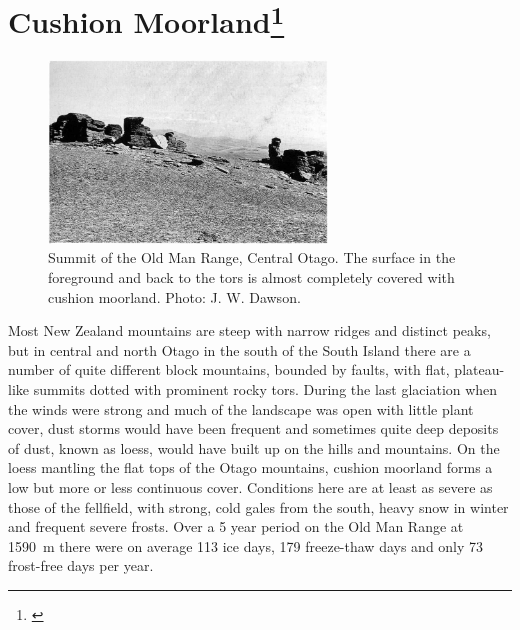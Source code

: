 \section[Cushion Moorland]{Cushion Moorland\thinspace\footnote{\cite{mark1970high}}}

\begin{figure}
	\includegraphics[width=0.66\textwidth]{graphics/figure113summit.jpg}
	\centering
	\caption[Summit of the Old Man Range]{Summit of the Old Man Range, Central Otago.
	The surface in the foreground and back to the tors is almost completely covered with cushion moorland.
	Photo: J. W. Dawson.}%
	\label{fig:113summit}
\end{figure}

Most New Zealand mountains are steep with narrow ridges and distinct peaks, but in central and north Otago in the south of the South Island there are a number of quite different block mountains, bounded by faults, with flat, plateau-like summits dotted with prominent rocky tors.
During the last glaciation when the winds were strong and much of the landscape was open with little plant cover, dust storms would have been frequent and sometimes quite deep deposits of dust, known as loess, would have built up on the hills and mountains.
On the loess mantling the flat tops of the Otago mountains, cushion moorland forms a low but more or less continuous cover.
Conditions here are at least as severe as those of the fellfield, with strong, cold gales from the south, heavy snow in winter and frequent severe frosts.
Over a 5 year period on the Old Man Range at \SI{1590}{\metre} there were on average 113 ice days, 179 freeze-thaw days and only 73 frost-free days per year.

